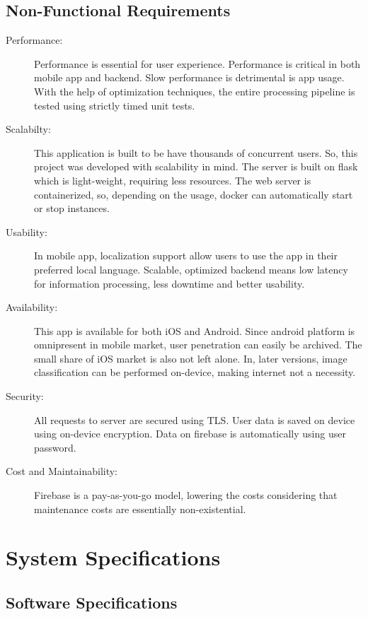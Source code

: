 \documentclass[../Report.tex]{subfiles}
\begin{document}
\subsection{Non-Functional Requirements}
\begin{description}
  \item[Performance: ] Performance is essential for user experience. Performance is critical in both mobile app and backend. Slow performance 
  is detrimental is app usage. With the help of optimization techniques, the entire processing pipeline is tested using strictly timed 
  unit tests.
  
  \item[Scalabilty: ] This application is built to be have thousands of concurrent users. So, this project was developed with scalability in 
  mind. The server is built on flask which is light-weight, requiring less resources. The web server is containerized, so, depending on the 
  usage, docker can automatically start or stop instances.

  \item[Usability: ] In mobile app, localization support allow users to use the app in their preferred local language. Scalable, optimized 
  backend means low latency for information processing, less downtime and better usability.

  \item[Availability: ] This app is available for both iOS and Android. Since android platform is omnipresent in mobile market, user 
  penetration can easily be archived. The small share of iOS market is also not left alone. In, later versions, image classification
  can be performed on-device, making internet not a necessity.

  \item[Security: ] All requests to server are secured using TLS. User data is saved on device using on-device encryption. Data on 
  firebase is automatically using user password.

  \item[Cost and Maintainability: ] Firebase is a pay-as-you-go model, lowering the costs considering that maintenance costs are 
  essentially non-existential.
\end{description} 

\section{System Specifications}

\subsection{Software Specifications}
\end{document}
